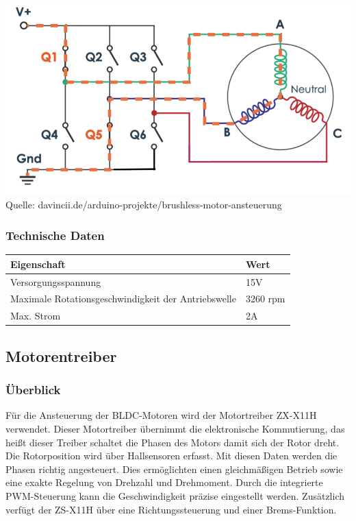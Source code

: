 \documentclass[ngerman,12pt,a4paper]{article}
\begin{document}
			\begin{center}
				\begin{minipage}{\textwidth}
					\centering
					\includegraphics[scale=0.6]{Pictures/Phasen_steuerung}
					\label{fig:spiffs_init}
					\vspace{-2pt}
					\small Quelle: davincii.de/arduino-projekte/brushless-motor-ansteuerung
				\end{minipage}
			\end{center}
			
			\subsubsection{Technische Daten}
			
			\begin{tabular}{| l | l |}  
				\hline  
				\textbf{Eigenschaft} & \textbf{Wert} \\   
				\hline  
				Versorgungsspannung & 15V \\  
				\hline  
				Maximale Rotationsgeschwindigkeit der Antriebswelle & 3260 rpm \\  
				\hline  
				Max. Strom & 2A \\  
				\hline  
			\end{tabular}
			
		\subsection{Motorentreiber} %
		
			\subsubsection{Überblick}
		Für die Ansteuerung der BLDC-Motoren wird der Motortreiber ZX-X11H verwendet. Dieser Motortreiber übernimmt die elektronische Kommutierung, das heißt dieser Treiber schaltet die Phasen des Motors damit sich der Rotor dreht. Die Rotorposition wird über Hallsensoren erfasst. Mit diesen Daten werden die Phasen richtig angesteuert. Dies ermöglichten einen gleichmäßigen Betrieb sowie eine exakte Regelung von Drehzahl und Drehmoment. Durch die integrierte PWM-Steuerung kann die Geschwindigkeit präzise eingestellt werden. Zusätzlich verfügt der ZS-X11H über eine Richtungssteuerung und einer Brems-Funktion.
		
\end{document}
